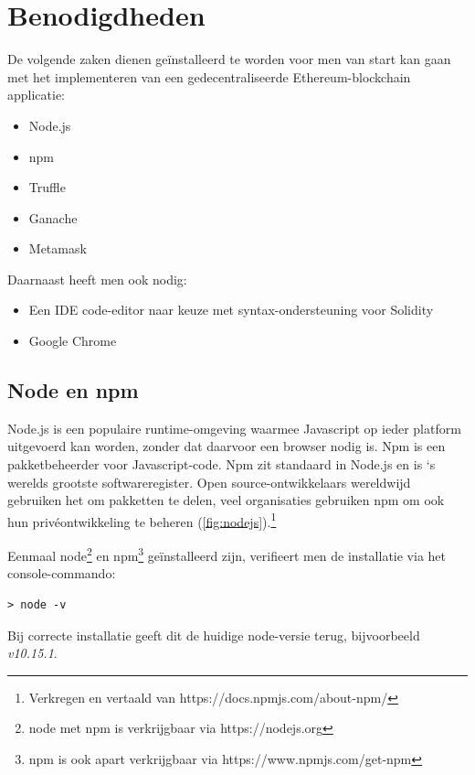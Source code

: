\section{Benodigdheden}
\label{sec:benodigdheden}
	De volgende zaken dienen geïnstalleerd te worden voor men van start kan gaan met het implementeren van een gedecentraliseerde Ethereum-blockchain applicatie:
	\begin{itemize}
		\item{Node.js}
		\item{npm}
		\item{Truffle}
		\item{Ganache}
		\item{Metamask}
	\end{itemize}
	Daarnaast heeft men ook nodig:
	\begin{itemize}
		\item{Een IDE code-editor naar keuze met syntax-ondersteuning voor Solidity}
		\item{Google Chrome}
	\end{itemize}
	\subsection{Node en npm}
	Node.js is een populaire runtime-omgeving waarmee Javascript op ieder platform uitgevoerd kan worden, zonder dat daarvoor een browser nodig is. Npm is een pakketbeheerder voor Javascript-code. Npm zit standaard in Node.js en is `s werelds grootste softwareregister. Open source-ontwikkelaars wereldwijd gebruiken het om pakketten te delen, veel organisaties gebruiken npm om ook hun privéontwikkeling te beheren (\ref{fig:nodejs}).\footnote{Verkregen en vertaald van https://docs.npmjs.com/about-npm/}
	
	Eenmaal node\footnote{node met npm is verkrijgbaar via https://nodejs.org} en npm\footnote{npm is ook apart verkrijgbaar via https://www.npmjs.com/get-npm} geïnstalleerd zijn, verifieert men de installatie via het console-commando: 
	\lstset{language=bash}
	\begin{lstlisting}[numbers=none]
	> node -v
	\end{lstlisting}Bij correcte installatie geeft dit de huidige node-versie terug, bijvoorbeeld \textit{v10.15.1}. 
	
